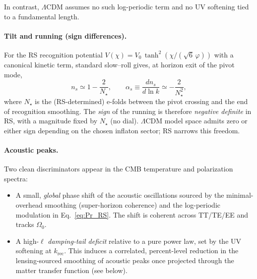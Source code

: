 \documentclass[11pt]{article}
\theoremstyle{definition}
\theoremstyle{remark}
\begin{document}
In contrast, \(\Lambda\)CDM assumes no such log-periodic term and no UV softening tied to a fundamental length.

\paragraph{Tilt and running (sign differences).}
For the RS recognition potential \(V(\chi)=V_0\,\tanh^2(\chi/(\sqrt6\,\varphi))\) with a canonical kinetic term, standard slow–roll gives, at horizon exit of the pivot mode,
\begin{equation}
\label{eq:ns_running}
n_s \simeq 1-\frac{2}{N_\star},\qquad
\alpha_s \equiv \frac{dn_s}{d\ln k} \simeq -\frac{2}{N_\star^2},
\end{equation}
where \(N_\star\) is the (RS-determined) e-folds between the pivot crossing and the end of recognition smoothing. The \emph{sign} of the running is therefore \emph{negative definite} in RS, with a magnitude fixed by \(N_\star\) (no dial). \(\Lambda\)CDM model space admits zero or either sign depending on the chosen inflaton sector; RS narrows this freedom.

\paragraph{Acoustic peaks.}
Two clean discriminators appear in the CMB temperature and polarization spectra:
\begin{itemize}
  \item A small, \emph{global} phase shift of the acoustic oscillations sourced by the minimal-overhead smoothing (super-horizon coherence) and the log-periodic modulation in Eq.~\eqref{eq:Pr_RS}. The shift is coherent across TT/TE/EE and tracks \(\Omega_0\).
  \item A high-\(\ell\) \emph{damping-tail deficit} relative to a pure power law, set by the UV softening at \(k_{\mathrm{rec}}\). This induces a correlated, percent-level reduction in the lensing-sourced smoothing of acoustic peaks once projected through the matter transfer function (see below).
\end{itemize}
\end{document}
